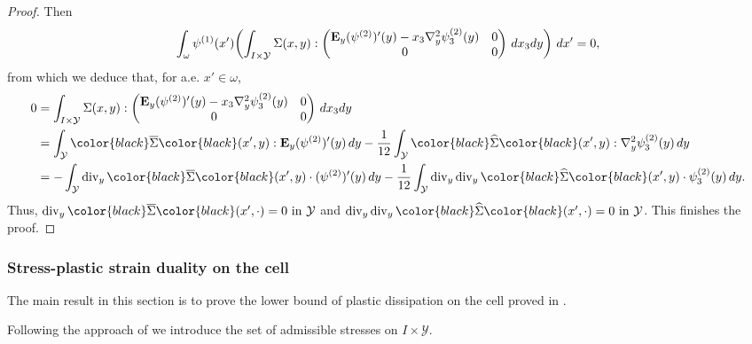 \documentclass[reqno,10pt]{amsart}
\numberwithin{equation}{section}
\theoremstyle{remark}
\newcommand{\BLACK}{\color{black}}
\newcommand{\PINK}{\color{black}}
\newcommand{\calY}{\mathcal{Y}}
\renewcommand{\div}{\operatorname{div}}
\newcommand{\zerothI}[1]{\overline{#1}}
\newcommand{\firstI}[1]{\widehat{#1}}
\newcommand{\E}{{\bf E}}
\newcommand{\D}{\nabla}
\begin{document}
\begin{proof}
Then
\begin{equation*}
	\int_{\omega} \psi^{(1)}(x') \!\left(\int_{I \times \calY} \Sigma(x,y) : \begin{pmatrix} {\E}_{y}(\psi^{(2)})'(y) - x_3 {\D}^2_{y}\psi^{(2)}_3(y) & 0 \\ 0 & 0 \end{pmatrix} \,dx_3 dy\right) \,dx' = 0,
\end{equation*}
from which we deduce that, for a.e. $x' \in \omega$,
\begin{align*}
	0 & = \int_{I \times \calY} \Sigma(x,y) : \begin{pmatrix} {\E}_{y}(\psi^{(2)})'(y) - x_3 {\D}^2_{y}\psi^{(2)}_3(y) & 0 \\ 0 & 0 \end{pmatrix} \,dx_3 dy\\
	& = \int_{\calY} {\PINK\zerothI{\Sigma}\BLACK}(x',y) : {\E}_{y}(\psi^{(2)})'(y) \,dy - \frac{1}{12} \int_{\calY} {\PINK\firstI{\Sigma}\BLACK}(x',y) : {\D}^2_{y}\psi^{(2)}_3(y) \,dy\\
	& = - \int_{\calY} \div_{y}{\PINK\zerothI{\Sigma}\BLACK}(x',y) \cdot (\psi^{(2)})'(y) \,dy - \frac{1}{12} \int_{\calY} \div_{y}\div_{y}{\PINK\firstI{\Sigma}\BLACK}(x',y) \cdot \psi^{(2)}_3(y) \,dy.
\end{align*}
Thus, $\div_{y}{\PINK\zerothI{\Sigma}\BLACK}(x',\cdot) = 0 \text{ in } \calY$ and $\div_{y}\div_{y}{\PINK\firstI{\Sigma}\BLACK}(x',\cdot) = 0 \text{ in } \calY$. This finishes the proof. 
\end{proof}

\subsubsection{Stress-plastic strain duality on the cell} \label{section stress-plastic strain duality on the cell} 
The main result in this section is to prove the lower bound of plastic dissipation on the cell proved in . 

Following the approach of \cite{Buzancic.Davoli.Velcic.2024.2nd} we introduce the set of admissible stresses on $I \times \calY$. 
\end{document}
